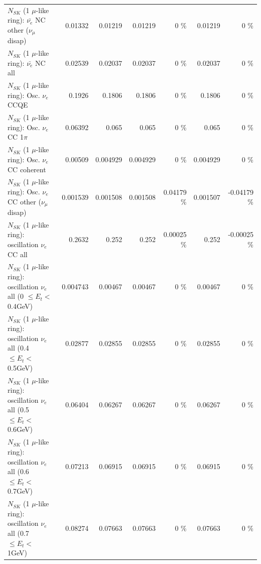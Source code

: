 \begin{table}
\begin{tabular}{| l | r | r | r  r | r  r |}
          $N_{SK}$ (1 $\mu$-like ring): $\bar{\nu_e}$ NC other ($\nu_\mu$ disap) &         0.01332 &         0.01219 &         0.01219 &        0 \%  &         0.01219 &        0 \%  \\ 
                            $N_{SK}$ (1 $\mu$-like ring): $\bar{\nu_{e}}$ NC all &         0.02539 &         0.02037 &         0.02037 &        0 \%  &         0.02037 &        0 \%  \\ 
\hline
\hline
\hline
                                 $N_{SK}$ (1 $\mu$-like ring): Osc. $\nu_e$ CCQE &          0.1926 &          0.1806 &          0.1806 &        0 \%  &          0.1806 &        0 \%  \\ 
                            $N_{SK}$ (1 $\mu$-like ring): Osc. $\nu_e$ CC 1$\pi$ &         0.06392 &           0.065 &           0.065 &        0 \%  &           0.065 &        0 \%  \\ 
                          $N_{SK}$ (1 $\mu$-like ring): Osc. $\nu_e$ CC coherent &         0.00509 &        0.004929 &        0.004929 &        0 \%  &        0.004929 &        0 \%  \\ 
           $N_{SK}$ (1 $\mu$-like ring): Osc. $\nu_e$ CC other ($\nu_\mu$ disap) &        0.001539 &        0.001508 &        0.001508 &  0.04179 \%  &        0.001507 & -0.04179 \%  \\ 
                        $N_{SK}$ (1 $\mu$-like ring): oscillation $\nu_e$ CC all &          0.2632 &           0.252 &           0.252 &  0.00025 \%  &           0.252 & -0.00025 \%  \\ 
\hline
$N_{SK}$ (1 $\mu$-like ring): oscillation $\nu_{e}$ all (0 $\leq E_{t} <$ 0.4GeV) &        0.004743 &         0.00467 &         0.00467 &        0 \%  &         0.00467 &        0 \%  \\ 
$N_{SK}$ (1 $\mu$-like ring): oscillation $\nu_{e}$ all (0.4 $\leq E_{t} <$ 0.5GeV) &         0.02877 &         0.02855 &         0.02855 &        0 \%  &         0.02855 &        0 \%  \\ 
$N_{SK}$ (1 $\mu$-like ring): oscillation $\nu_{e}$ all (0.5 $\leq E_{t} <$ 0.6GeV) &         0.06404 &         0.06267 &         0.06267 &        0 \%  &         0.06267 &        0 \%  \\ 
$N_{SK}$ (1 $\mu$-like ring): oscillation $\nu_{e}$ all (0.6 $\leq E_{t} <$ 0.7GeV) &         0.07213 &         0.06915 &         0.06915 &        0 \%  &         0.06915 &        0 \%  \\ 
$N_{SK}$ (1 $\mu$-like ring): oscillation $\nu_{e}$ all (0.7 $\leq E_{t} <$ 1GeV) &         0.08274 &         0.07663 &         0.07663 &        0 \%  &         0.07663 &        0 \%  \\ 

\end{tabular}
\end{table}
